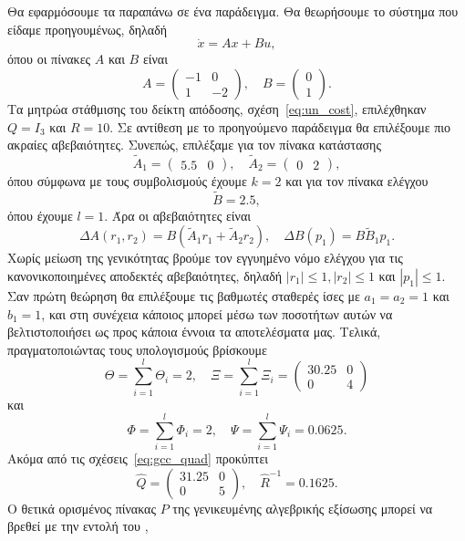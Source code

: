 Θα εφαρμόσουμε τα παραπάνω σε ένα παράδειγμα. Θα θεωρήσουμε το σύστημα που
είδαμε προηγουμένως, δηλαδή
\[
    \dot{x} = Ax + Bu,
\]
όπου οι πίνακες \( A \) και \( B \) είναι
\[
    A =
    \begin{pmatrix}
        -1 & 0 \\
        1 & -2
    \end{pmatrix}, \quad
    B = \begin{pmatrix}0 \\ 1\end{pmatrix}.
\]
Τα μητρώα στάθμισης του δείκτη απόδοσης, σχέση~\eqref{eq:un_cost}, επιλέχθηκαν
\( Q = I_3 \) και \( R = 10 \). Σε αντίθεση με το προηγούμενο παράδειγμα θα
επιλέξουμε πιο ακραίες αβεβαιότητες. Συνεπώς, επιλέξαμε για τον πίνακα
κατάστασης
\[
    \tilde{A}_1 = \begin{pmatrix}5.5 & 0\end{pmatrix},\quad
    \tilde{A}_2 = \begin{pmatrix}0 & 2\end{pmatrix},
\]
όπου σύμφωνα με τους συμβολισμούς έχουμε \( k = 2 \) και για τον πίνακα ελέγχου
\[
    \tilde{B} = 2.5,
\]
όπου έχουμε \( l = 1 \). Άρα οι αβεβαιότητες είναι
\[
    \Delta A(r_1, r_2) =
    B\left(\tilde{A}_1r_1 + \tilde{A}_2r_2\right), \quad
    \Delta B(p_1) = B\tilde{B}_1p_1.
\]
Χωρίς μείωση της γενικότητας βρούμε τον εγγυημένο νόμο ελέγχου για τις
κανονικοποιημένες αποδεκτές αβεβαιότητες, δηλαδή \( |r_1| \leq 1, |r_2| \leq 1
\) και \( |p_1| \leq 1 \). Σαν πρώτη θεώρηση θα επιλέξουμε τις βαθμωτές σταθερές
ίσες με \( a_1 = a_2 = 1 \) και \( b_1 = 1 \), και στη συνέχεια κάποιος μπορεί
μέσω των ποσοτήτων αυτών να βελτιστοποιήσει ως προς κάποια έννοια τα αποτελέσματα μας.
Τελικά, πραγματοποιώντας τους υπολογισμούς βρίσκουμε
\[
    \Theta = \sum_{i = 1}^l\Theta_i = 2, \quad
    \Xi = \sum_{i = 1}^l\Xi_i =
    \begin{pmatrix}
        30.25 & 0 \\
         0 & 4
     \end{pmatrix}
\]
και
\[
    \Phi = \sum_{i = 1}^l\Phi_i = 2,\quad
    \Psi = \sum_{i = 1}^l\Psi_i = 0.0625.
\]
Ακόμα από τις σχέσεις~\eqref{eq:gcc_quad} προκύπτει
\[
    \hat{Q} =
    \begin{pmatrix}
        31.25 & 0 \\
         0 & 5
     \end{pmatrix}, \quad
     \hat{R}^{-1} = 0.1625.
\]
Ο θετικά ορισμένος πίνακας \( P \) της γενικευμένης αλγεβρικής εξίσωσης
 μπορεί να βρεθεί με την εντολή  του ,
